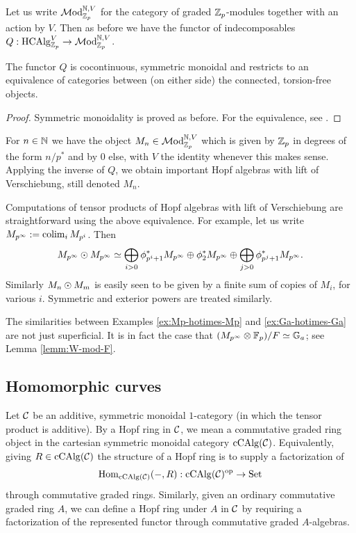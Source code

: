 Let us write $\mathcal{M}\mathrm{od}_{\mathbb{Z}_p}^{\mathbb{N},V}$ for the category of graded $\mathbb{Z}_p$-modules together with an action by $V$.
Then as before we have the functor of indecomposables $Q: \mathrm{HCAlg}_{\mathbb{Z}_p}^V \to \mathcal{M}\mathrm{od}_{\mathbb{Z}_p}^{\mathbb{N},V}$.
\begin{proposition}[Goerss] \label{prop:Hopf-with-V}
The functor $Q$ is cocontinuous, symmetric monoidal and restricts to an equivalence of categories between (on either side) the connected, torsion-free objects.
\end{proposition}
\begin{proof}
Symmetric monoidality is proved as before.
For the equivalence, see \cite[Theorem 2.7]{goerss-dieudonne}.
\end{proof}

\begin{example} \label{ex:M-versch}
For $n \in \mathbb{N}$ we have the object $M_n \in \mathcal{M}\mathrm{od}_{\mathbb{Z}_p}^{\mathbb{N},V}$ which is given by $\mathbb{Z}_p$ in degrees of the form $n/p^*$ and by $0$ else, with $V$ the identity whenever this makes sense.
Applying the inverse of $Q$, we obtain important Hopf algebras with lift of Verschiebung, still denoted $M_n$.
\end{example}

\begin{example} \label{ex:Mp-hotimes-Mp}
Computations of tensor products of Hopf algebras with lift of Verschiebung are straightforward using the above equivalence.
For example, let us write $M_{p^\infty} := \operatorname*{colim}_i M_{p^i}$.
Then \[ M_{p^\infty} \odot M_{p^\infty} \simeq \bigoplus_{i > 0} \phi_{p^i + 1}^* M_{p^\infty} \oplus \phi_2^* M_{p^\infty} \oplus \bigoplus_{j > 0} \phi_{p^j + 1}^* M_{p^\infty}. \]
Similarly $M_n \odot M_m$ is easily seen to be given by a finite sum of copies of $M_i$, for various $i$.
Symmetric and exterior powers are treated similarly.
\end{example}

\begin{remark}
The similarities between Examples \ref{ex:Mp-hotimes-Mp} and \ref{ex:Ga-hotimes-Ga} are not just superficial.
It is in fact the case that $(M_{p^\infty} \otimes \mathbb{F}_p)/F \simeq {\mathbb G}_a$; see Lemma \ref{lemm:W-mod-F}.
\end{remark}

\subsection{Homomorphic curves}\label{subsec:RW-moduli}
Let $\mathcal C$ be an additive, symmetric monoidal $1$-category (in which the tensor product is additive).
By a Hopf ring in $\mathcal C$, we mean a commutative graded ring object in the cartesian symmetric monoidal category $\mathrm{cCAlg}(\mathcal C)$.
Equivalently, giving $R \in \mathrm{cCAlg}(\mathcal C)$ the structure of a Hopf ring is to supply a factorization of \[ \operatorname{Hom}_{\mathrm{cCAlg}(\mathcal C)}(\mathord-, R): \mathrm{cCAlg}(\mathcal C)^{\mathrm{op}} \to \mathrm{Set} \] through commutative graded rings.
Similarly, given an ordinary commutative graded ring $A$, we can define a Hopf ring under $A$ in $\mathcal C$ by requiring a factorization of the represented functor through commutative graded $A$-algebras.


